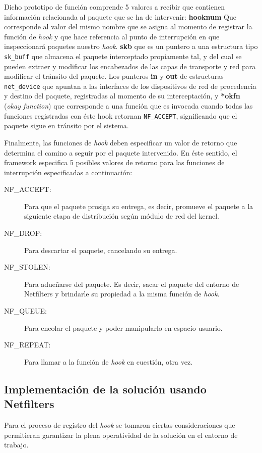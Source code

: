 Dicho prototipo de función comprende 5 valores a recibir que contienen información relacionada al paquete que se ha de intervenir: \textbf{hooknum} Que corresponde al valor del mismo nombre que se asigna al momento de registrar la función de \emph{hook} y que hace referencia al punto de interrupción en que inspeccionará paquetes nuestro \emph{hook}. \textbf{skb} que es un puntero a una estructura tipo \verb=sk_buff= que almacena el paquete interceptado propiamente tal, y del cual se pueden extraer y modificar los encabezados de las capas de transporte y red para modificar el tránsito del paquete. Los punteros \textbf{in} y \textbf{out} de estructuras \verb=net_device= que apuntan a las interfaces de los dispositivos de red de procedencia y destino del paquete, registradas al momento de su interceptación, y \textbf{*okfn} (\emph{okay function}) que corresponde a una función que es invocada cuando todas las funciones registradas con éste hook retornan \verb=NF_ACCEPT=, significando que el paquete sigue en tránsito por el sistema.

Finalmente, las funciones de \emph{hook} deben especificar un valor de retorno que determina el camino a seguir por el paquete intervenido. En éste sentido, el framework especifica 5 posibles valores de retorno para las funciones de interrupción especificadas a continuación:
\begin{description}
\item[NF\_ACCEPT:] Para que el paquete prosiga su entrega, es decir, promueve el paquete a la siguiente etapa de distribución según módulo de red del kernel.
\item[NF\_DROP:] Para descartar el paquete, cancelando su entrega.
\item[NF\_STOLEN:] Para adueñarse del paquete. Es decir, sacar el paquete del entorno de Netfilters y brindarle su propiedad a la misma función de \emph{hook}.
\item[NF\_QUEUE:] Para encolar el paquete y poder manipularlo en espacio usuario.
\item[NF\_REPEAT:] Para llamar a la función de \emph{hook} en cuestión, otra vez.
\end{description}

\subsection{Implementación de la solución usando Netfilters}
Para el proceso de registro del \emph{hook} se tomaron ciertas consideraciones que permitieran garantizar la plena operatividad de la solución en el entorno de trabajo.

